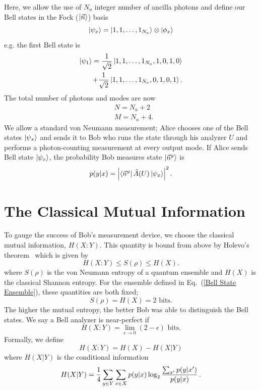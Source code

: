 \documentclass[aps,pra,twocolumn,showpacs,superscriptaddress,floatfix,10pt]{revtex4}
\begin{document}
Here, we allow the use of $N_a$ integer number of ancilla photons and define our Bell states in the Fock ($\ket{\vec{n}}$) basis
\begin{equation}
\label{Bell States Phi}
	\ket{\psi_x} = \ket{1,1,\dots,1_{N_a}} \otimes \ket{\phi_x}
\end{equation}
e.g. the first Bell state is
\begin{eqnarray}
	\ket{\psi_1} = \frac{1}{\sqrt{2}}  \ket{1,1,\dots,1_{N_a},1,0,1,0} \\
	+ \frac{1}{\sqrt{2}} \ket{1,1,\dots,1_{N_a},0,1,0,1}. \nonumber 
\end{eqnarray}
The total number of photons and modes are now
\begin{eqnarray}
	& N = N_a + 2 \\
	& M = N_a + 4.
\end{eqnarray}
We allow a standard von Neumann measurement; Alice chooses one of the Bell states $\ket{\psi_x}$ and sends it to Bob who runs the state through his analyzer $U$ and performs a photon-counting measurement at every output mode.
If Alice sends Bell state $\ket{\psi_x}$, the probability Bob measures state $\ket{\vec{n}^y}$ is
\begin{equation}
	\label{Probability of Measurment}
	p( y | x ) = \abs{\bra{\vec{n}^y} \hat{A}(U) \ket{\psi_x}}^2 \, .
\end{equation}
\section{The Classical Mutual Information}
\label{Section on Mutual Entropy}
To gauge the success of Bob's measurement device, we choose the classical mutual information, $H(X:Y)$. This quantity is bound from above by Holevo's theorem~\cite{Holevo} which is
given by
\begin{equation}
\label{Holevo Theorem}
H(X:Y) \le S(\rho) \le H(X).
\end{equation}
where $S(\rho)$ is the von Neumann entropy of a quantum ensemble and $H(X)$ is the classical Shannon entropy.
For the ensemble defined in Eq.~(\ref{Bell State Ensemble}), these quantities are both fixed;
\begin{equation}
	S(\rho) = H(X) = \mbox{2 bits}.
\end{equation}
The higher the mutual entropy, the better Bob was able to distinguish the Bell states. We say a Bell analyzer is near-perfect if
\begin{equation}
	\label{Near Perfect Condition}
	H(X:Y) = \lim\limits_{\epsilon \rightarrow 0} (2 - \epsilon) \mbox{ bits.}
\end{equation}
Formally, we define
\begin{equation}
	\label{Mutual Entropy}
	H(X:Y) = H(X) - H(X|Y)
\end{equation}
where $H(X|Y)$ is the conditional information
\begin{equation}
\label{Conditional Entropy}
\small
H(X|Y) = \frac{1}{4} \sum_{y \in Y} \sum_{x \in X} p(y|x) \log_2 \frac{\sum_{x^\prime} p(y|x^\prime)}{p(y|x)}\,.
\end{equation}
\end{document}
